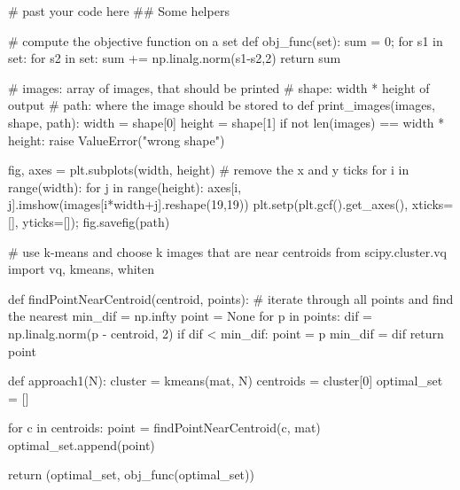 \begin{python}
# past your code here
## Some helpers

# compute the objective function on a set
def obj_func(set):
    sum = 0;
    for s1 in set:
        for s2 in set:
            sum += np.linalg.norm(s1-s2,2)
    return sum


# images: array of images, that should be printed
# shape: width * height of output
# path: where the image should be stored to
def print_images(images, shape, path):
    width = shape[0]
    height = shape[1]
    if not len(images) == width * height:
         raise ValueError("wrong shape")
        
    fig, axes = plt.subplots(width, height)
    # remove the x and y ticks
    for i in range(width):
        for j in range(height):
            axes[i, j].imshow(images[i*width+j].reshape(19,19))
    plt.setp(plt.gcf().get_axes(), xticks=[], yticks=[]);
    fig.savefig(path)

# use k-means and choose k images that are near centroids
from scipy.cluster.vq import vq, kmeans, whiten

def findPointNearCentroid(centroid, points):
    # iterate through all points and find the nearest
    min_dif = np.infty
    point = None
    for p in points:
        dif = np.linalg.norm(p - centroid, 2)
        if dif < min_dif:
            point = p
            min_dif = dif
    return point
    

def approach1(N):    
    cluster = kmeans(mat, N)
    centroids = cluster[0]
    optimal_set = []

    for c in centroids:
        point = findPointNearCentroid(c, mat)
        optimal_set.append(point)
        
    return (optimal_set, obj_func(optimal_set))
    

\end{python}
\vspace{2cm}

